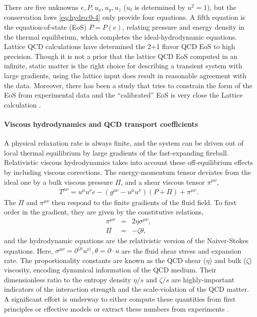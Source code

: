 There are five unknowns $e, P, u_x, u_y, u_z$ ($u_t$ is determined by $u^2 = 1$), but the conservation laws \ref{eq:hydro:0-4} only provide four equations.
A fifth equation is the equation-of-state (EoS) $P = P(e)$, relating pressure and energy density in the thermal equilibrium, which completes the ideal-hydrodynamic equations.
Lattice QCD calculations have determined the 2+1 flavor QCD EoS to high precision.
Though it is not a prior that the lattice QCD EoS computed in an infinite, static matter is the right choice for describing a transient system with large gradients, using the lattice input does result in reasonable agreement with the data.
Moreover, there has been a study that tries to constrain the form of the EoS from experimental data and the ``calibrated'' EoS is very close the Lattice calculation \cite{Pratt:2015zsa}.

\paragraph{Viscous hydrodynamics and QCD transport coefficients}
A physical relaxation rate is always finite, and the system can be driven out of local thermal equilibrium by large gradients of the fast-expanding fireball.
Relativistic viscous hydrodynamics takes into account these off-equilibrium effects by including viscous corrections.
The energy-momentum tensor deviates from the ideal one by a bulk viscous pressure $\Pi$, and a shear viscous tensor $\pi^{\mu\nu}$,
\begin{eqnarray}
T^{\mu\nu} = u^\mu u^\nu e - (g^{\mu\nu}- u^\mu u^\nu) (P+\Pi) + \pi^{\mu\nu}.
\end{eqnarray}
The $\Pi$ and $\pi^{\mu\nu}$ then respond to the finite gradients of the fluid field.
To first order in the gradient, they are given by the constitutive relations,
\begin{eqnarray}
\pi^{\mu\nu} &=& 2\eta\sigma^{\mu\nu},\\
\Pi &=& -\zeta\theta,
\end{eqnarray}
and the hydrodynamic equations are the relativistic version of the Naiver-Stokes equations.
Here, $\sigma^{\mu\nu} = \partial^{\langle \mu} u^{\nu\rangle}, \theta = \partial\cdot u$ are the fluid shear stress and expansion rate.
The proportionality constants are known as the QCD shear ($\eta$) and bulk ($\zeta$) viscosity, encoding dynamical information of the QCD medium. 
Their dimensionless ratio to the entropy density $\eta/s$ and $\zeta/s$ are highly-important indicators of the interaction strength and the scale-violation of the QCD matter.
A significant effort is underway to either compute these quantities from first principles or effective models or extract these numbers from experiments \cite{Bernhard:2015hxa,Bernhard:2016tnd,Auvinen:2017fjw,Bernhard:2018hnz,Novak:2013bqa}.

